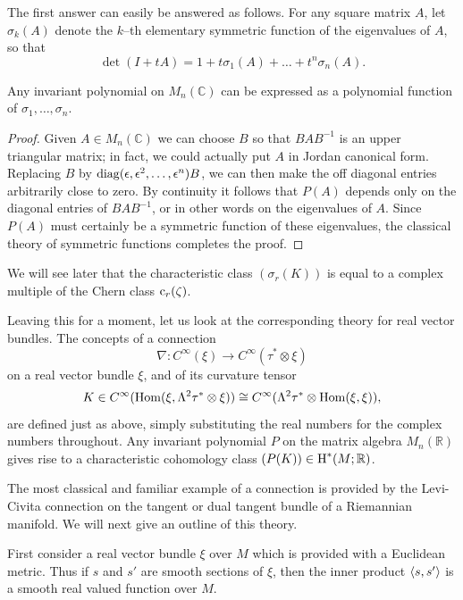 \documentclass[../main]{subfiles}
\begin{document}
The first answer can easily be answered as follows. For any square matrix $A$, let $\sigma_k(A)$ denote the $k$--th elementary symmetric function of the eigenvalues of $A$, so that \[\det(I + t A) = 1 + t \sigma_1(A) + \ldots + t^n \sigma_n(A).\] 

\begin{lemma}
Any invariant polynomial on $M_n(\mathbb C)$ can be expressed as a polynomial function of $\sigma_1, \ldots, \sigma_n$. 
\end{lemma}

\begin{proof}
Given $A \in M_n(\mathbb C)$ we can choose $B$ so that $BAB^{-1}$ is an upper triangular matrix; in fact, we could actually put $A$ in Jordan canonical form. Replacing $B$ by $\operatorname{diag}(\epsilon, \epsilon^2, \ldots, \epsilon^n)B$, we can then make the off diagonal entries arbitrarily close to zero. By continuity it follows that $P(A)$ depends only on the diagonal entries of $BAB^{-1}$, or in other words on the eigenvalues of $A$. Since $P(A)$ must certainly be a symmetric function of these eigenvalues, the classical theory of symmetric functions completes the proof. 
\end{proof}

We will see later that the characteristic class $(\sigma_r(K))$ is equal to a complex multiple of the Chern class $\operatorname{c}_r(\zeta)$. 

Leaving this for a moment, let us look at the corresponding theory for real vector bundles. The concepts of a connection \[\nabla : C^\infty(\xi) \longrightarrow C^\infty(\tau^\ast \otimes \xi)\] on a real vector bundle $\xi$, and of its curvature tensor \[K \in C^\infty(\operatorname{Hom}(\xi, \Lambda^2 \tau^\ast \otimes \xi)) \cong C^\infty(\Lambda^2 \tau^\ast \otimes \operatorname{Hom}(\xi, \xi)),\] are defined just as above, simply substituting the real numbers for the complex numbers throughout. Any invariant polynomial $P$ on the matrix algebra $M_n(\mathbb R)$ gives rise to a characteristic cohomology class $(P(K)) \in \operatorname{H}^\ast(M; \mathbb R)$. 

The most classical and familiar example of a connection is provided by the Levi-Civita connection on the tangent or dual tangent bundle of a Riemannian manifold. We will next give an outline of this theory.

First consider a real vector bundle $\xi$ over $M$ which is provided with a Euclidean metric. Thus if $s$ and $s'$ are smooth sections of $\xi$, then the inner product $\langle s,s'\rangle$ is a smooth real valued function over $M$. 
\end{document}
